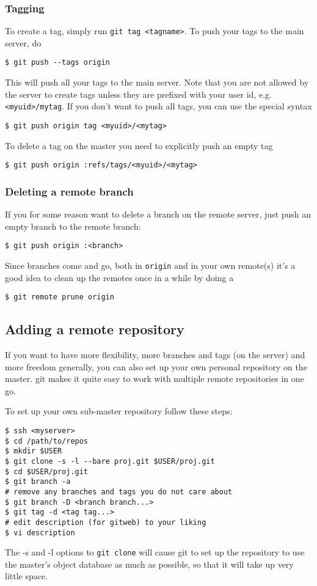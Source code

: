 \documentclass[a4paper,10pt]{article}
\begin{document}
\subsubsection{Tagging} 
To create a tag, simply run {\tt git tag <tagname>}. To push
your tags to the main server, do
\begin{verbatim}
$ git push --tags origin 
\end{verbatim}
This will push all your tags to the main server. Note that you are not allowed
by the server to create tags unless they are prefixed with your user id, e.g. 
{\tt <myuid>/mytag}. If you don't want to push all tags, you can use the special
syntax
\begin{verbatim}
$ git push origin tag <myuid>/<mytag>
\end{verbatim}
To delete a tag on the master you need to explicitly push an empty tag
\begin{verbatim}
$ git push origin :refs/tags/<myuid>/<mytag>
\end{verbatim}

\subsubsection{Deleting a remote branch} 
If you for some reason want to delete a branch
on the remote server, just push an empty branch to the remote branch:
\begin{verbatim}
$ git push origin :<branch>
\end{verbatim}

Since branches come and go, both in {\tt origin} and in your own remote(s)
it's a good idea to clean up the remotes once in a while by doing a
\begin{verbatim}
$ git remote prune origin
\end{verbatim}

\subsection{Adding a remote repository}
If you want to have more
flexibility, more branches and tags (on the server) and more freedom
generally, you can also set up your own personal repository on the master. git
makes it quite easy to work with multiple remote repositories in one go. 

To set up your own sub-master repository follow these steps:
\begin{verbatim}
$ ssh <myserver>
$ cd /path/to/repos
$ mkdir $USER
$ git clone -s -l --bare proj.git $USER/proj.git
$ cd $USER/proj.git 
$ git branch -a 
# remove any branches and tags you do not care about
$ git branch -D <branch branch...>
$ git tag -d <tag tag...>
# edit description (for gitweb) to your liking 
$ vi description
\end{verbatim}
The -s and -l options to {\tt git clone} will cause git to set up the
repository to use the master's object database as much as possible, so that it
will take up very little space. 
\end{document}
